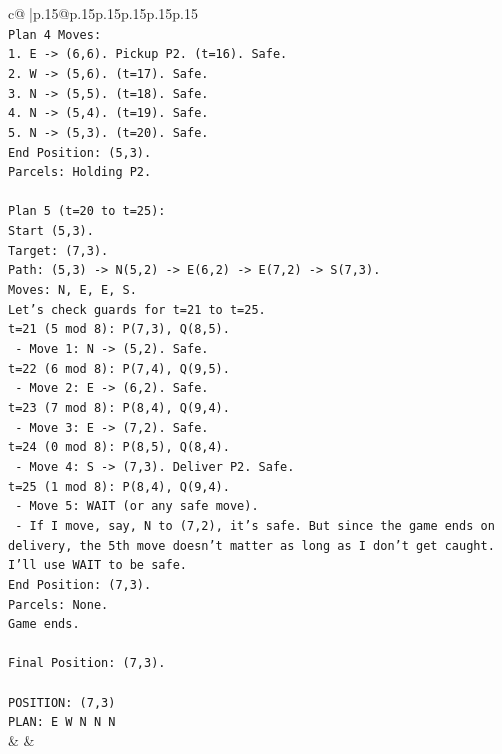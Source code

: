 \documentclass{article}
\begin{document}
{\begin{supertabular}{c@{$\;$}|p{.15\linewidth}@{}p{.15\linewidth}p{.15\linewidth}p{.15\linewidth}p{.15\linewidth}p{.15\linewidth}}
{{{\\ 
\texttt{Plan 4 Moves:} \\
\texttt{1. E {-}> (6,6). Pickup P2. (t=16). Safe.} \\
\texttt{2. W {-}> (5,6). (t=17). Safe.} \\
\texttt{3. N {-}> (5,5). (t=18). Safe.} \\
\texttt{4. N {-}> (5,4). (t=19). Safe.} \\
\texttt{5. N {-}> (5,3). (t=20). Safe.} \\
\texttt{End Position: (5,3).} \\
\texttt{Parcels: Holding P2.} \\
\\ 
\texttt{Plan 5 (t=20 to t=25):} \\
\texttt{Start (5,3).} \\
\texttt{Target: (7,3).} \\
\texttt{Path: (5,3) {-}> N(5,2) {-}> E(6,2) {-}> E(7,2) {-}> S(7,3).} \\
\texttt{Moves: N, E, E, S.} \\
\texttt{Let's check guards for t=21 to t=25.} \\
\texttt{t=21 (5 mod 8): P(7,3), Q(8,5).} \\
\texttt{   {-} Move 1: N {-}> (5,2). Safe.} \\
\texttt{t=22 (6 mod 8): P(7,4), Q(9,5).} \\
\texttt{   {-} Move 2: E {-}> (6,2). Safe.} \\
\texttt{t=23 (7 mod 8): P(8,4), Q(9,4).} \\
\texttt{   {-} Move 3: E {-}> (7,2). Safe.} \\
\texttt{t=24 (0 mod 8): P(8,5), Q(8,4).} \\
\texttt{   {-} Move 4: S {-}> (7,3). Deliver P2. Safe.} \\
\texttt{t=25 (1 mod 8): P(8,4), Q(9,4).} \\
\texttt{   {-} Move 5: WAIT (or any safe move).} \\
\texttt{   {-} If I move, say, N to (7,2), it's safe. But since the game ends on delivery, the 5th move doesn't matter as long as I don't get caught. I'll use WAIT to be safe.} \\
\texttt{End Position: (7,3).} \\
\texttt{Parcels: None.} \\
\texttt{Game ends.} \\
\\ 
\texttt{Final Position: (7,3).} \\
\\ 
\texttt{POSITION: (7,3)} \\
\texttt{PLAN: E W N N N} \\
            }
        }
    }
    & & \\ \\


\end{supertabular}}
\end{document}
